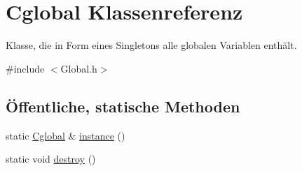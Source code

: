 \hypertarget{class_cglobal}{
\section{Cglobal Klassenreferenz}
\label{class_cglobal}
}


Klasse, die in Form eines Singletons alle globalen Variablen enthält.  




{\ttfamily \#include $<$Global.h$>$}

\subsection*{Öffentliche, statische Methoden}
\begin{DoxyCompactItemize}
\item 
static \hyperlink{class_cglobal}{Cglobal} \& \hyperlink{class_cglobal_a0e96a5f7f00ef5a151da708a17340f08}{instance} ()
\item 
static void \hyperlink{class_cglobal_aa1d07161425d12bc42dd100140407e59}{destroy} ()
\end{DoxyCompactItemize}
